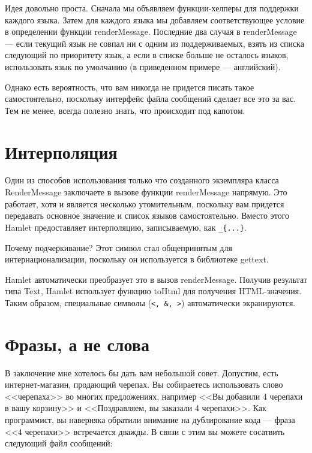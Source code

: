 Идея довольно проста. Сначала мы объявляем функции-хелперы для поддержки каждого языка. Затем для каждого языка мы добавляем соответствующее условие в определении функции renderMessage. Последние два случая в renderMessage --- если текущий язык не совпал ни с одним из поддерживаемых, взять из списка следующий по приоритету язык, а если в списке больше не осталось языков, использовать язык по умолчанию (в приведенном примере --- английский).

Однако есть вероятность, что вам никогда не придется писать такое самостоятельно, поскольку интерфейс файла сообщений сделает все это за вас. Тем не менее, всегда полезно знать, что происходит под капотом.

\section{Интерполяция} %

Один из способов использования только что созданного экземпляра класса RenderMessage заключаете в вызове функции renderMessage напрямую. Это работает, хотя и является несколько утомительным, поскольку вам придется передавать основное значение и список языков самостоятельно. Вместо этого Hamlet предоставляет интерполяцию, записываемую, как \lstinline'_{...}'.

\begin{remark}
Почему подчеркивание? Этот символ стал общепринятым для интернационализации, поскольку он используется в библиотеке gettext.
\end{remark}

Hamlet автоматически преобразует это в вызов renderMessage. Получив результат типа Text, Hamlet использует функцию toHtml для получения HTML-значения. Таким образом, специальные символы (\lstinline'<, &, >') автоматически экранируются.

\section{Фразы, а не слова} %

В заключение мне хотелось бы дать вам небольшой совет. Допустим, есть интернет-магазин, продающий черепах. Вы собираетесь использовать слово <<черепаха>> во многих предложениях, например <<Вы добавили 4 черепахи в вашу корзину>> и <<Поздравляем, вы заказали 4 черепахи>>. Как программист, вы наверняка обратили внимание на дублирование кода --- фраза <<4 черепахи>> встречается дважды. В связи с этим вы можете сосатвить следующий файл сообщений:


